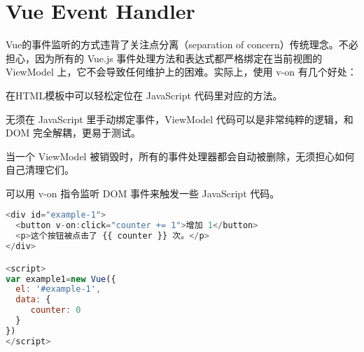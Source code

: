 \begin{lstlisting}[language=JavaScript]

\end{lstlisting}




\begin{lstlisting}[language=JavaScript]

\end{lstlisting}



\begin{lstlisting}[language=JavaScript]

\end{lstlisting}




\begin{lstlisting}[language=JavaScript]

\end{lstlisting}



\begin{lstlisting}[language=JavaScript]

\end{lstlisting}







\chapter{Vue Event Handler}

Vue的事件监听的方式违背了关注点分离（separation of concern）传统理念。不必担心，因为所有的 Vue.js 事件处理方法和表达式都严格绑定在当前视图的 ViewModel 上，它不会导致任何维护上的困难。实际上，使用 v-on 有几个好处：

\begin{compactitem}
\item 在HTML模板中可以轻松定位在 JavaScript 代码里对应的方法。

\item 无须在 JavaScript 里手动绑定事件，ViewModel 代码可以是非常纯粹的逻辑，和 DOM 完全解耦，更易于测试。
\item 当一个 ViewModel 被销毁时，所有的事件处理器都会自动被删除，无须担心如何自己清理它们。
\end{compactitem}

可以用 v-on 指令监听 DOM 事件来触发一些 JavaScript 代码。


\begin{lstlisting}[language=JavaScript]
<div id="example-1">
  <button v-on:click="counter += 1">增加 1</button>
  <p>这个按钮被点击了 {{ counter }} 次。</p>
</div>

<script>
var example1=new Vue({
  el: '#example-1',
  data: {
     counter: 0
  }
})
</script>
\end{lstlisting}



